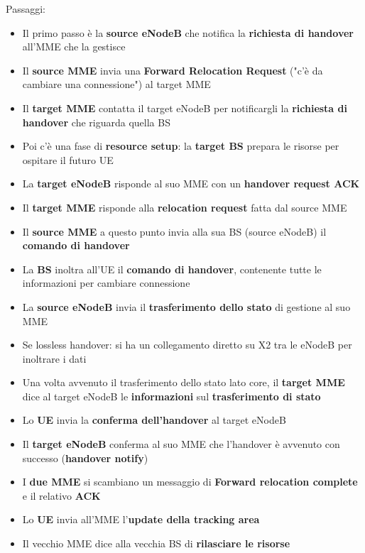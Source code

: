 Passaggi: 
\begin{itemize}
	\item Il primo passo è la \textbf{source eNodeB} che notifica la \textbf{richiesta di handover} all'MME che la gestisce

	\item Il \textbf{source MME} invia una \textbf{Forward Relocation Request} ("c'è da cambiare una connessione") al target MME

	\item Il \textbf{target MME} contatta il target eNodeB per notificargli la \textbf{richiesta di handover} che riguarda quella BS

	\item Poi c'è una fase di \textbf{resource setup}: la \textbf{target BS} prepara le risorse per ospitare il futuro UE

	\item La \textbf{target eNodeB} risponde al suo MME con un \textbf{handover request ACK}

	\item Il \textbf{target MME} risponde alla \textbf{relocation request} fatta dal source MME

	\item Il \textbf{source MME} a questo punto invia alla sua BS (source eNodeB) il \textbf{comando di handover}

	\item La \textbf{BS} inoltra all'UE il \textbf{comando di handover}, contenente tutte le informazioni per cambiare connessione

	\item La \textbf{source eNodeB} invia il \textbf{trasferimento dello stato} di gestione al suo MME

	\item Se lossless handover: si ha un collegamento diretto su X2 tra le eNodeB per inoltrare i dati

	\item Una volta avvenuto il trasferimento dello stato lato core, il \textbf{target MME} dice al target eNodeB le \textbf{informazioni} sul \textbf{trasferimento di stato}

	\item Lo \textbf{UE} invia la \textbf{conferma dell'handover} al target eNodeB

	\item Il \textbf{target eNodeB} conferma al suo MME che l'handover è avvenuto con successo (\textbf{handover notify})

	\item I \textbf{due MME} si scambiano un messaggio di \textbf{Forward relocation complete} e il relativo \textbf{ACK}

	\item Lo \textbf{UE} invia all'MME l'\textbf{update della tracking area}

	\item Il vecchio MME dice alla vecchia BS di \textbf{rilasciare le risorse}
\end{itemize}

